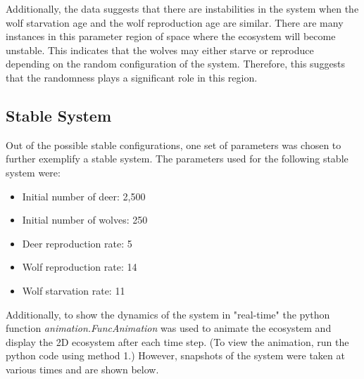 \documentclass[a4paper,12pt]{article}
\begin{document}
Additionally, the data suggests that there are instabilities in the system when the wolf starvation age and the wolf reproduction
age are similar.  There are many instances in this parameter region of space where the ecosystem will become unstable.  This indicates that the wolves may 
either starve or reproduce depending on the random configuration of the system.  Therefore, this suggests that the randomness plays a significant role in this 
region. 

\subsection{Stable System}
\indent
\indent Out of the possible stable configurations, one set of parameters was chosen to further exemplify a stable system.  The parameters used for the following 
stable system were:
\begin{itemize}
  \item{Initial number of deer: 2,500}
  \item{Initial number of wolves: 250}
  \item{Deer reproduction rate: 5}
  \item{Wolf reproduction rate: 14}
  \item{Wolf starvation rate: 11}
  \end{itemize}
Additionally, to show the dynamics of the system in "real-time" the python function \textit{
animation.FuncAnimation} was used to animate the ecosystem and display the 2D ecosystem after each time step.  (To view the animation, run the python code using 
method 1.)  However, snapshots of the system were taken at various times and are shown below.
\end{document}
